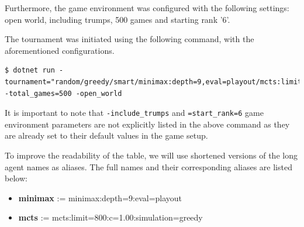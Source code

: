 Furthermore, the game environment was configured with the following settings: open world, including trumps, 500 games and starting rank '6'.

The tournament was initiated using the following command, with the aforementioned configurations.

\begin{lstlisting}
$ dotnet run -tournament="random/greedy/smart/minimax:depth=9,eval=playout/mcts:limit=800,c=1.00,simulation=greedy" -total_games=500 -open_world
\end{lstlisting}

It is important to note that \texttt{-include\_trumps} and \texttt{=start\_rank=6} game environment parameters are not explicitly listed in the above command as they are already set to their default values in the game setup.

To improve the readability of the table, we will use shortened versions of the long agent names as aliases. The full names and their corresponding aliases are listed below:

\begin{itemize}
	\item \textbf{minimax} := minimax:depth=9:eval=playout
	\item \textbf{mcts} := mcts:limit=800:c=1.00:simulation=greedy
\end{itemize}

